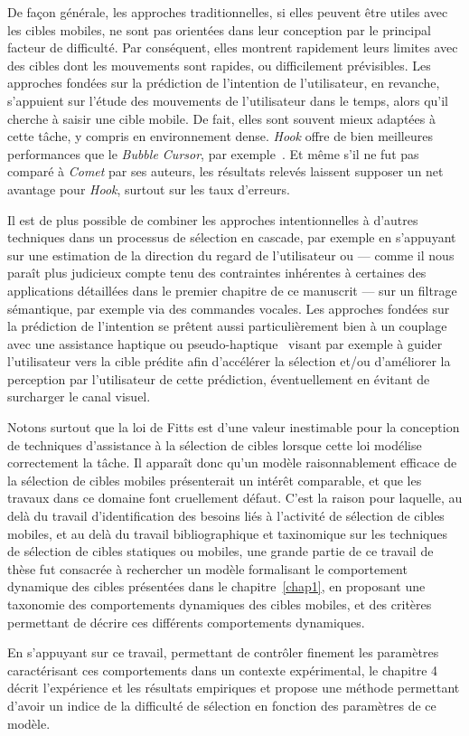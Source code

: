     De façon générale, les approches traditionnelles, si elles peuvent être utiles avec les cibles mobiles, ne sont pas orientées dans leur conception par le principal facteur de difficulté. Par conséquent, elles montrent rapidement leurs limites avec des cibles dont les mouvements sont rapides, ou difficilement prévisibles. Les approches fondées sur la prédiction de l'intention de l'utilisateur, en revanche, s'appuient sur l'étude des mouvements de l'utilisateur dans le temps, alors qu'il cherche à saisir une cible mobile. De fait, elles sont souvent mieux adaptées à cette tâche, y compris en environnement dense. \emph{Hook} offre de bien meilleures performances que le \emph{Bubble Cursor}, par exemple~\cite{ortega2013hook}. Et même s'il ne fut pas comparé à \emph{Comet} par ses auteurs, les résultats relevés laissent supposer un net avantage pour \emph{Hook}, surtout sur les taux d'erreurs.
    
    Il est de plus possible de combiner les approches intentionnelles à d'autres techniques dans un processus de sélection en cascade, par exemple en s'appuyant sur une estimation de la direction du regard de l'utilisateur ou --- comme il nous paraît plus judicieux compte tenu des contraintes inhérentes à certaines des applications détaillées dans le premier chapitre de ce manuscrit --- sur un filtrage sémantique, par exemple via des commandes vocales. Les approches fondées sur la prédiction de l'intention se prêtent aussi particulièrement bien à un couplage avec une assistance haptique ou pseudo-haptique~\cite{lecuyer2009simulating, pusch2011pseudo} visant par exemple à guider l'utilisateur vers la cible prédite afin d'accélérer la sélection et/ou d'améliorer la perception par l'utilisateur de cette prédiction, éventuellement en évitant de surcharger le canal visuel.
    
    Notons surtout que la loi de Fitts est d'une valeur inestimable pour la conception de techniques d'assistance à la sélection de cibles lorsque cette loi modélise correctement la tâche. Il apparaît donc qu'un modèle raisonnablement efficace de la sélection de cibles mobiles présenterait un intérêt comparable, et que les travaux dans ce domaine font cruellement défaut. C'est la raison pour laquelle, au delà du travail d'identification des besoins liés à l'activité de sélection de cibles mobiles, et au delà du travail bibliographique et taxinomique sur les techniques de sélection de cibles statiques ou mobiles, une grande partie de ce travail de thèse fut consacrée à rechercher un modèle formalisant le comportement dynamique des cibles présentées dans le chapitre~\ref{chap1}, en proposant une taxonomie des comportements dynamiques des cibles mobiles, et des critères permettant de décrire ces différents comportements dynamiques.
    
    En s'appuyant sur ce travail, permettant de contrôler finement les paramètres caractérisant ces comportements dans un contexte expérimental, le chapitre 4 décrit l'expérience et les résultats empiriques et propose une méthode permettant d'avoir un indice de la difficulté de sélection en fonction des paramètres de ce modèle.
